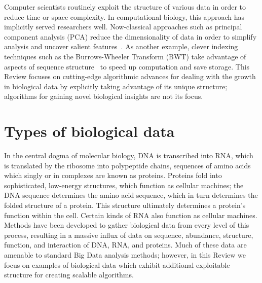 \documentclass{acm_proc_article-sp}
\begin{document}
Computer scientists routinely exploit the structure of various data in
order to reduce time or space complexity.
In computational biology, this approach has implicitly served researchers well.
Now-classical approaches such as principal component analysis (PCA) reduce the 
dimensionality of data in order to simplify analysis and uncover salient 
features~\cite{berger2013computational}.
As another example, clever indexing techniques such as the Burrows-Wheeler 
Transform (BWT) take advantage of aspects of sequence 
structure~\cite{berger2013computational} to speed up computation and save storage.
This Review focuses on cutting-edge algorithmic advances for dealing with the growth in 
biological data by explicitly taking advantage of its unique structure; algorithms for gaining novel biological insights are not its 
focus.


\section{Types of biological data}

In the central dogma of molecular biology, DNA is transcribed into RNA, which
is translated by the ribosome into polypeptide chains, sequences of amino 
acids which singly or in complexes are known as proteins.
Proteins fold into sophisticated, low-energy structures, which function as
cellular machines; the DNA sequence determines the amino acid sequence,
which in turn determines the folded structure of a protein.
This structure ultimately determines a protein's function within the cell.
Certain kinds of RNA also function as cellular 
machines.
Methods have been developed to gather biological data from every level of this process,
resulting in a massive influx of data on sequence, abundance, structure, function, and interaction of DNA, RNA, and proteins.
Much of these data are amenable to standard Big Data analysis methods; however, in this Review we focus on examples of biological data which exhibit additional exploitable structure for creating scalable algorithms.
\end{document}
